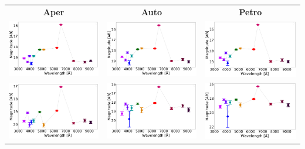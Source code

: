 \begin{table}
\begin{tabular}{ccc}
\textbf{Aper} & \textbf{Auto} & \textbf{Petro} \\
\includegraphics[width=0.3\linewidth, clip]{photopectrum_splus_MC0072-006125_aper.pdf} & \includegraphics[width=0.3\linewidth, clip]{photopectrum_splus_MC0072-006125_auto.pdf} & \includegraphics[width=0.3\linewidth, clip]{photopectrum_splus_MC0072-006125_petro.pdf} \\
\includegraphics[width=0.3\linewidth, clip]{photopectrum_splus_MC0072-044863_aper.pdf} & \includegraphics[width=0.3\linewidth, clip]{photopectrum_splus_MC0072-044863_auto.pdf} & \includegraphics[width=0.3\linewidth, clip]{photopectrum_splus_MC0072-044863_petro.pdf} \\

\end{tabular}
\end{table}

